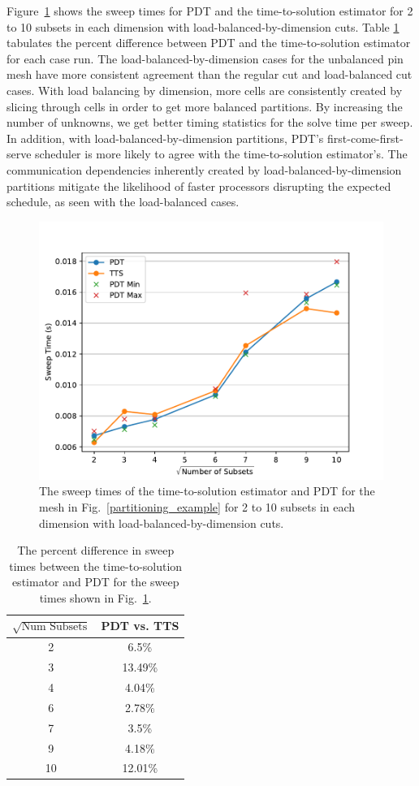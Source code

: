 Figure~\ref{comp_lbd_spiderweb} shows the sweep times for PDT and the time-to-solution estimator for 2 to 10 subsets in each dimension with load-balanced-by-dimension cuts.
Table \ref{diff_lbd_spiderweb} tabulates the percent difference between PDT and the time-to-solution estimator for each case run.
The load-balanced-by-dimension cases for the unbalanced pin mesh have more consistent agreement than the regular cut and load-balanced cut cases.
With load balancing by dimension, more cells are consistently created by slicing through cells in order to get more balanced partitions.
By increasing the number of unknowns, we get better timing statistics for the solve time per sweep.
In addition, with load-balanced-by-dimension partitions, PDT's first-come-first-serve scheduler is more likely to agree with the time-to-solution estimator's.
The communication dependencies inherently created by load-balanced-by-dimension partitions mitigate the likelihood of faster processors disrupting the expected schedule, as seen with the load-balanced cases.
\begin{figure}[!ht]
  \centering
  \includegraphics[scale=0.75]{../../figures/spiderweb_lbd_pdtvtts.pdf}
  \caption{The sweep times of the time-to-solution estimator and PDT for the mesh in Fig.~\ref{partitioning_example} for 2 to 10 subsets in each dimension with load-balanced-by-dimension cuts.}
\label{comp_lbd_spiderweb}
\end{figure}
\begin{table}[!ht]
\centering
\caption{The percent difference in sweep times between the time-to-solution estimator and PDT for the sweep times shown in Fig.~\ref{comp_lbd_spiderweb}.}
\label{diff_lbd_spiderweb}
\begin{tabular}{c|c}
\textbf{$\sqrt{\text{Num Subsets}}$} & \bf PDT vs. TTS \\ \hline
2&6.5\%\\ \hline
3&13.49\%\\ \hline
4&4.04\%\\ \hline
6&2.78\%\\ \hline
7&3.5\%\\ \hline
9&4.18\%\\ \hline
10&12.01\%
\end{tabular}
\end{table}

